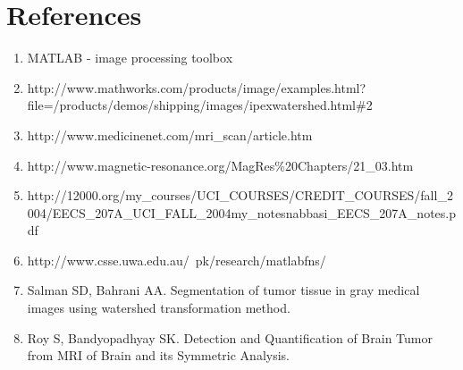 \documentclass[12pt]{article}
\theoremstyle{plain}%
\theoremstyle{definition}
\theoremstyle{remark}
\begin{document}
\section{References}
\begin{enumerate}
\item \textsc{MATLAB} - image processing toolbox
\item http://www.mathworks.com/products/image/examples.html?file=/products/demos/shipping/images/ipexwatershed.html\#2
\item http://www.medicinenet.com/mri\_scan/article.htm
\item http://www.magnetic-resonance.org/MagRes\%20Chapters/21\_03.htm
\item http://12000.org/my\_courses/UCI\_COURSES/CREDIT\_COURSES/fall\_2004/EECS\_207A\_UCI\_FALL\_2004\/my\_notes\/nabbasi\_EECS\_207A\_notes.pdf
\item http://www.csse.uwa.edu.au/~pk/research/matlabfns/
\item Salman SD, Bahrani AA. Segmentation of tumor tissue in gray medical images using watershed transformation method.
\item Roy S, Bandyopadhyay SK. Detection and Quantification of Brain Tumor from MRI of Brain and its Symmetric Analysis.
\end{enumerate}
	
\end{document}
